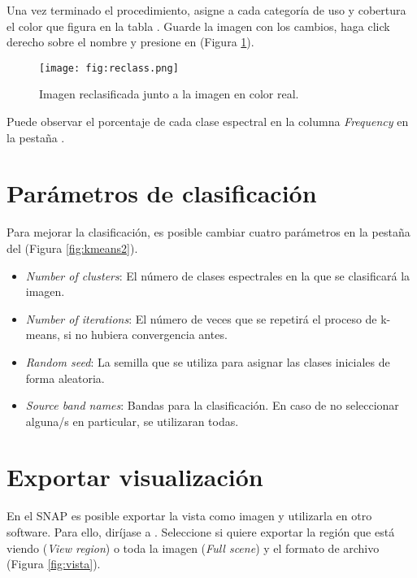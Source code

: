 Una vez terminado el procedimiento, asigne a cada categoría de uso y cobertura el color que figura en la tabla . Guarde la imagen con los cambios, haga click derecho sobre el nombre y presione en  (Figura \ref{fig:resclass}).

\begin{figure}[h!]
    \centering
    \texttt{[image: fig:reclass.png]}
    \caption{Imagen reclasificada junto a la imagen en color real.}
    \label{fig:resclass}
\end{figure}


Puede observar el porcentaje de cada clase espectral en la columna \emph{Frequency} en la pestaña .

\section{Parámetros de clasificación}

Para mejorar la clasificación, es posible cambiar cuatro parámetros en la pestaña  del  (Figura \ref{fig:kmeans2}).

\begin{itemize}
  \item \emph{Number of clusters}: El número de clases espectrales en la que se clasificará la imagen.
  \item \emph{Number of iterations}: El número de veces que se repetirá el proceso de k-means, si no hubiera convergencia antes.
  \item \emph{Random seed}: La semilla que se utiliza para asignar las clases iniciales de forma aleatoria.
  \item \emph{Source band names}: Bandas para la clasificación. En caso de no seleccionar alguna/s en particular, se utilizaran todas.
\end{itemize}

\section{Exportar visualización}

En el SNAP es posible exportar la vista como imagen y utilizarla en otro software. Para ello, diríjase a . Seleccione si quiere exportar la región que está viendo (\emph{View region}) o toda la imagen (\emph{Full scene}) y el formato de archivo (Figura \ref{fig:vista}).

